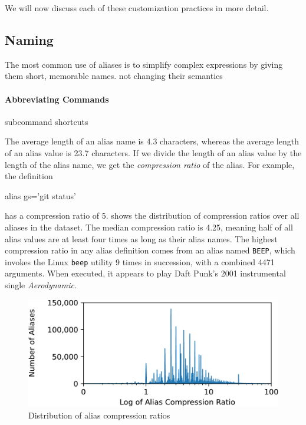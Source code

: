 We will now discuss each of these customization practices in more detail.


\subsection{Naming}

The most common use of aliases is to simplify complex expressions by giving them short, memorable names.
\TODO not changing their semantics

\paragraph{\bf Abbreviating Commands}

\TODO subcommand shortcuts

The average length of an alias name is 4.3 characters, whereas the average length of an alias value is 23.7 characters.
If we divide the length of an alias value by the length of the alias name, we get the \emph{compression ratio} of the alias.
For example, the definition
\begin{CVerbatim}
alias gs='git status'
\end{CVerbatim}
has a compression ratio of 5.
 shows the distribution of compression ratios over all aliases in the dataset.
The median compression ratio is 4.25, meaning half of all alias values are at least four times as long as their alias names.
The highest compression ratio in any alias definition comes from an alias named \verb|BEEP|, which invokes the Linux \verb|beep| utility 9 times in succession, with a combined \num{4471} arguments.
When executed, it appears to play Daft Punk's 2001 instrumental single \emph{Aerodynamic}.

\begin{figure}
    \centering
    \includegraphics[width=0.95\columnwidth]{figures/compression.pdf}
    \caption{Distribution of alias compression ratios}
    \label{fig:compression}
\end{figure}

